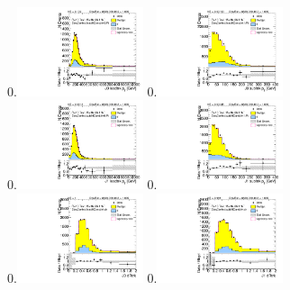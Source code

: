 \begin{figure}[htbp!]
\begin{center}
0.\includegraphics[width=0.33\textwidth, angle=270]{./figures/boosted/Control/Moriond_TwoTag_split_Control_leadHCand_trk0_Pt.pdf}
0.\includegraphics[width=0.33\textwidth, angle=270]{./figures/boosted/Control/Moriond_TwoTag_split_Control_leadHCand_trk1_Pt.pdf}\\
0.\includegraphics[width=0.33\textwidth, angle=270]{./figures/boosted/Control/Moriond_TwoTag_split_Control_sublHCand_trk0_Pt.pdf}
0.\includegraphics[width=0.33\textwidth, angle=270]{./figures/boosted/Control/Moriond_TwoTag_split_Control_sublHCand_trk1_Pt.pdf}\\
0.\includegraphics[width=0.33\textwidth, angle=270]{./figures/boosted/Control/Moriond_TwoTag_split_Control_leadHCand_trk_dr.pdf}
0.\includegraphics[width=0.33\textwidth, angle=270]{./figures/boosted/Control/Moriond_TwoTag_split_Control_sublHCand_trk_dr.pdf}

\end{center}
\end{figure}
